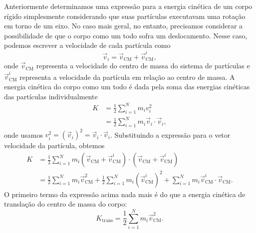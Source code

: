 
Anteriormente determinamos uma expressão para a energia cinética de um corpo rígido simplesmente considerando que suas partículas executavam uma rotação em torno de um eixo. No caso mais geral, no entanto, precisamos considerar a possibilidade de que o corpo como um todo sofra um deslocamento. Nesse caso, podemos escrever a velocidade de cada partícula como
\begin{equation}
    \vec{v}_i = \vec{v}_{\text{CM}} + \vec{v}^i_{\text{CM}},
\end{equation}
%
onde $\vec{v}_{\text{CM}}$ representa a velocidade do centro de massa do sistema de partículas e $\vec{v}^i_{\text{CM}}$ representa a velocidade da partícula em relação ao centro de massa. A energia cinética do corpo como um todo é dada pela soma das energias cinéticas das partículas individualmente
\begin{align}
    K &= \frac{1}{2}\sum_{i = 1}^{N} m_i v_i^2 \\
    &= \frac{1}{2}\sum_{i = 1}^{N} m_i \vec{v}_i \cdot \vec{v}_i,
\end{align}
%
onde usamos $v_i^2 = (\vec{v}_i)^2 = \vec{v}_i\cdot\vec{v}_i$. Substituindo a expressão para o vetor velocidade da partícula, obtemos
\begin{align}
    K &= \frac{1}{2}\sum_{i = 1}^N m_i (\vec{v}_{\text{CM}} + \vec{v}^i_{\text{CM}})\cdot (\vec{v}_{\text{CM}} + \vec{v}^i_{\text{CM}}) \\
    &= \frac{1}{2}\sum_{i = 1}^N m_i \vec{v}_{\text{CM}}^2 + \frac{1}{2}\sum_{i = 1}^N m_i (\vec{v}^i_{\text{CM}})^2 + \sum_{i=1}^N m_i \vec{v}^i_{\text{CM}} \cdot \vec{v}_{\text{CM}}.
\end{align}
%
O primeiro termo da expressão acima nada mais é do que a energia cinética de translação do centro de massa do corpo:
\begin{equation}
    K_{\text{trans}} = \frac{1}{2}\sum_{i = 1}^N m_i \vec{v}_{\text{CM}}^2.
\end{equation}
